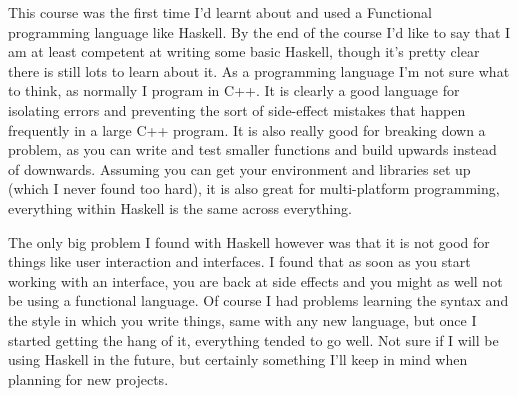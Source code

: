 \documentclass[10point]{article}
\begin{document}
This course was the first time I'd learnt about and used a Functional programming language like Haskell. By the end of the course I'd like to say that I am at least competent at writing some basic Haskell, though it's pretty clear there is still lots to learn about it. As a programming language I'm not sure what to think, as normally I program in C++. It is clearly a good language for isolating errors and preventing the sort of side-effect mistakes that happen frequently in a large C++ program. It is also really good for breaking down a problem, as you can write and test smaller functions and build upwards instead of downwards. Assuming you can get your environment and libraries set up (which I never found too hard), it is also great for multi-platform programming, everything within Haskell is the same across everything.

The only big problem I found with Haskell however was that it is not good for things like user interaction and interfaces. I found that as soon as you start working with an  interface, you are back at side effects and you might as well not be using a functional language. Of course I had problems learning the syntax and the style in which you write things, same with any new language, but once I started getting the hang of it, everything tended to go well. Not sure if I will be using Haskell in the future, but certainly something I'll keep in mind when planning for new projects.
\end{document}
